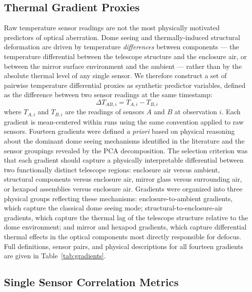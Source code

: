 \documentclass[SE,authoryear,toc]{lsstdoc}
\begin{document}
\subsection{Thermal Gradient Proxies}
\label{subsec: Proxies}
Raw temperature sensor readings are not the most physically motivated predictors of optical aberration. Dome seeing and thermally-induced structural deformation are driven by temperature \textit{differences} between components — the temperature differential between the telescope structure and the enclosure air, or between the mirror surface environment and the ambient — rather than by the absolute thermal level of any single sensor.
We therefore construct a set of pairwise temperature differential proxies as synthetic predictor variables, defined as the difference between two sensor readings at the same timestamp:
\begin{equation}
\Delta T_{AB,i} = T_{A,i} - T_{B,i}
\end{equation}
where $T_{A,i}$ and $T_{B,i}$ are the readings of sensors $A$ and $B$ at observation $i$. Each gradient is mean-centered within runs using the same convention applied to raw sensors.
Fourteen gradients were defined \textit{a priori} based on physical reasoning about the dominant dome seeing mechanisms identified in the literature and the sensor groupings revealed by the PCA decomposition. The selection criterion was that each gradient should capture a physically interpretable differential between two functionally distinct telescope regions: enclosure air versus ambient, structural components versus enclosure air, mirror glass versus surrounding air, or hexapod assemblies versus enclosure air. Gradients were organized into three physical groups reflecting these mechanisms: enclosure-to-ambient gradients, which capture the classical dome seeing mode; structural-to-enclosure-air gradients, which capture the thermal lag of the telescope structure relative to the dome environment; and mirror and hexapod gradients, which capture differential thermal effects in the optical components most directly responsible for defocus. Full definitions, sensor pairs, and physical descriptions for all fourteen gradients are given in Table~\ref{tab:gradients}.

\subsection{Single Sensor Correlation Metrics}
\label{subsec: Correlation}
\end{document}
